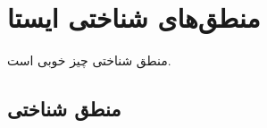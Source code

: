 \chapter{منطق‌های شناختی ایستا}
منطق شناختی چیز خوبی است.
\section{منطق شناختی \texorpdfstring{ }{(EL)}}
